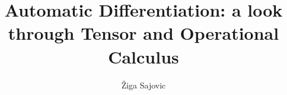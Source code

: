 
\title{Automatic Differentiation: a look through Tensor and Operational Calculus}
\author[1]{Žiga Sajovic}
\date{}


\maketitle










\printbibliography


